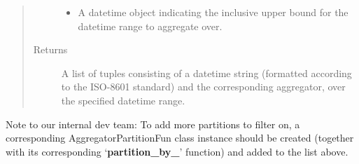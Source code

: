 \documentclass[letterpaper,10pt,english]{sphinxmanual}
\begin{document}
\begin{fulllineitems}
\begin{fulllineitems}
\begin{quote}
\begin{description}
\begin{itemize}
\item {} 
 \textendash{} A datetime object indicating the inclusive upper bound for the datetime range to
aggregate over.

\end{itemize}

\item[{Returns}] \leavevmode
A list of tuples consisting of a datetime string (formatted according to the ISO-8601 standard)
and the corresponding aggregator, over the specified datetime range.

\end{description}\end{quote}

\end{fulllineitems}


\begin{fulllineitems}
\label{\detokenize{pydash_app.dashboard.aggregator.aggregator_group:pydash_app.dashboard.aggregator.aggregator_group.AggregatorGroup.partition_funs}}
Note to our internal dev team:
To add more partitions to filter on, a corresponding AggregatorPartitionFun class instance should be created
(together with its corresponding ‘{\color{red}\bfseries{}partition\_by\_}’ function) and added to the  list above.

\end{fulllineitems}



\end{fulllineitems}
\end{document}
